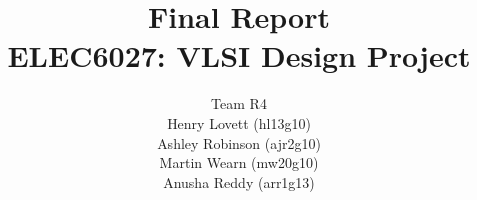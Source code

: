 \documentclass[draft, 12pt, titlepage]{report}
\author{Team R4 \\ Henry Lovett (hl13g10) \\ Ashley Robinson (ajr2g10) \\ Martin Wearn (mw20g10) \\ Anusha Reddy (arr1g13)}
\title{Final Report \\ ELEC6027: VLSI Design Project \todo{Format title page}}
\begin{document}
\maketitle
\listoftodos
\tableofcontents






\appendix



\end{document}
